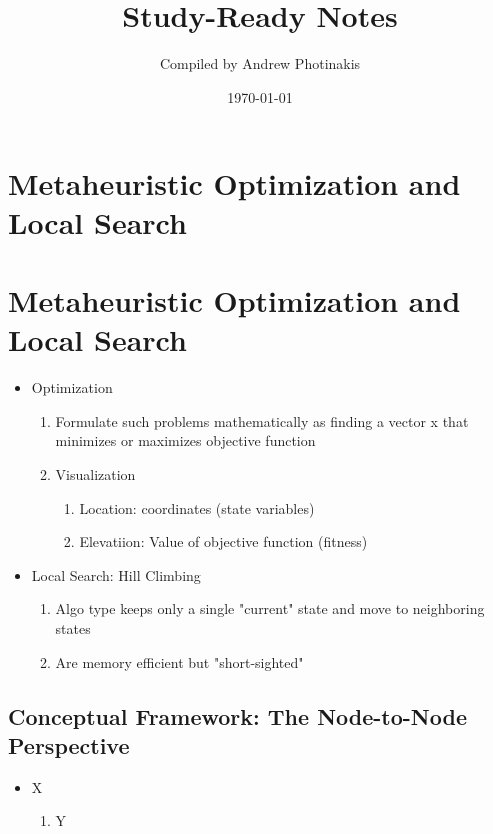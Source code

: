 \documentclass[12pt]{article}
\title{\TOPICTITLE\\\large Study-Ready Notes}
\author{Compiled by Andrew Photinakis}
\date{\today}
\begin{document}
\maketitle
\tableofcontents
\newpage

\section*{Metaheuristic Optimization and Local Search}

\section{Metaheuristic Optimization and Local Search}

\begin{itemize}
    \item Optimization
          \begin{enumerate}
              \item Formulate such problems mathematically as finding a vector x that minimizes or maximizes objective function
              \item Visualization
                    \begin{enumerate}
                        \item Location: coordinates (state variables)
                        \item Elevatiion: Value of objective function (fitness)
                    \end{enumerate}
          \end{enumerate}
    \item Local Search: Hill Climbing
          \begin{enumerate}
              \item Algo type keeps only a single "current" state and move to neighboring states
              \item Are memory efficient but "short-sighted"
          \end{enumerate}
\end{itemize}


\subsection{Conceptual Framework: The Node-to-Node Perspective}



\begin{itemize}
    \item X
          \begin{enumerate}
              \item Y
          \end{enumerate}
\end{itemize}
\end{document}
